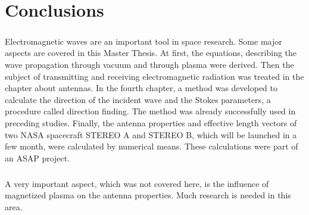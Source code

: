 \documentclass[a4paper,10pt]{thesis}
\begin{document}
\chapter{\textbf{Conclusions}}
\paragraph*{}
Electromagnetic waves are an important tool in space research. Some major aspects are covered in this Master Thesis. At first, the equations, describing the wave propagation through vacuum and through plasma were derived. Then the subject of transmitting and receiving electromagnetic radiation was treated in the chapter about antennas. In the fourth chapter, a method was developed to calculate the direction of the incident wave and the Stokes parameters, a procedure called direction finding. The method was already successfully used in preceding studies. Finally, the antenna properties and effective length vectors of two NASA spacecraft STEREO A and STEREO B, which will be launched in a few month, were calculated by numerical means. These calculations were part of an ASAP project.

\paragraph{}
A very important aspect, which was not covered here, is the influence of magnetized plasma on the antenna properties. Much research is needed in this area.
\end{document}

